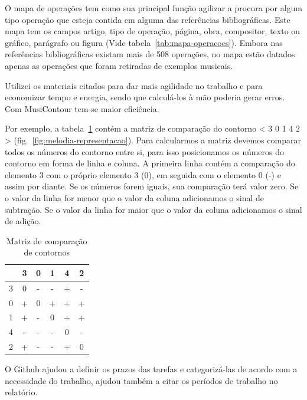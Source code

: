 \documentclass[11pt]{article}
\begin{document}
\label{sec:discussao}

O mapa de operações tem como sua principal função agilizar a procura
por algum tipo operação que esteja contida em alguma das referências
bibliográficas. Este mapa
tem os campos artigo, tipo de operação, página, obra,
compositor, texto ou gráfico, parágrafo ou figura (Vide
tabela~\ref{tab:mapa-operacoes}). Embora nas referências
bibliográficas existam mais de 508 operações, no mapa estão datados
apenas as operações que foram retiradas de exemplos musicais.

Utilizei os materiais citados para dar mais agilidade no trabalho e
para economizar tempo e energia, sendo que calculá-los à mão poderia
gerar erros. Com MusiContour tem-se maior eficiência.

Por exemplo, a tabela~\ref{tab:matriz-comparacao-contornos} contém a
matriz de comparação do contorno < 3 0 1 4 2 >
(fig.~\ref{fig:melodia-representacao}). Para calcularmos a matriz
devemos comparar todos os números do contorno entre si, para isso
posicionamos os números do contorno em forma de linha e coluna. A
primeira linha contém a comparação do elemento 3 com o próprio
elemento 3 (0), em seguida com o elemento 0 (-) e assim por diante. Se
os números forem iguais, sua comparação terá valor zero. Se o valor da
linha for menor que o valor da coluna adicionamos o sinal de
subtração. Se o valor da linha for maior que o valor da coluna
adicionamos o sinal de adição.

\begin{table}
  \centering
  \begin{tabular}{c|ccccc}
    &3&0&1&4&2\\
    \hline
    3&0&-&-&+&-\\
    0&+&0&+&+&+\\
    1&+&-&0&+&+\\
    4&-&-&-&0&-\\
    2&+&-&-&+&0\\
  \end{tabular}
  \caption{Matriz de comparação de contornos}
  \label{tab:matriz-comparacao-contornos}
\end{table}

O Github ajudou a definir os prazos das tarefas e categorizá-las de
acordo com a necessidade do trabalho, ajudou também a citar os
períodos de trabalho no relatório.
\end{document}
